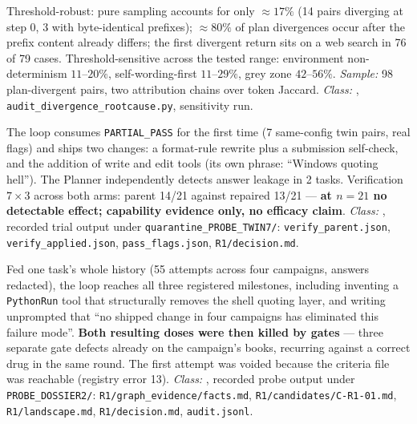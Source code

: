 \begin{description}[leftmargin=0pt,labelindent=0pt,labelsep=0pt,style=nextline,font=\normalfont,itemsep=6pt]
\item[\textbf{F25}\quad Divergence root cause, at content level.]
Threshold-robust: pure sampling accounts for only $\approx 17\%$ (14 pairs
diverging at step 0, 3 with byte-identical prefixes); $\approx 80\%$ of
plan divergences occur after the prefix content already differs; the first
divergent return sits on a web search in 76 of 79 cases.
Threshold-sensitive across the tested range: environment
non-determinism $11$--$20\%$, self-wording-first $11$--$29\%$, grey zone
$42$--$56\%$. \emph{Sample:} 98 plan-divergent pairs, two attribution
chains over token Jaccard. \emph{Class:} ,
\texttt{audit\_divergence\_rootcause.py}, sensitivity run.

\item[\textbf{F26}\quad Twin-feeding probe, end to end.]
The loop consumes \texttt{PARTIAL\_PASS} for the first time (7 same-config
twin pairs, real flags) and ships two changes: a format-rule rewrite plus a
submission self-check, and the addition of write and edit tools (its own
phrase: ``Windows quoting hell''). The Planner independently detects answer
leakage in 2 tasks. Verification $7 \times 3$ across both arms: parent
14/21 against repaired 13/21 --- \textbf{at $n=21$ no detectable effect;
capability evidence only, no efficacy claim}. \emph{Class:} ,
recorded trial output under \texttt{quarantine\_PROBE\_TWIN7/}:
\texttt{verify\_parent.json}, \texttt{verify\_applied.json},
\texttt{pass\_flags.json}, \texttt{R1/decision.md}.

\item[\textbf{F27}\quad Episodic dossier probe, isolated re-run.]
Fed one task's whole history (55 attempts across four campaigns, answers
redacted), the loop reaches all three registered milestones, including
inventing a \texttt{PythonRun} tool that structurally removes the shell
quoting layer, and writing unprompted that ``no shipped change in four
campaigns has eliminated this failure mode''. \textbf{Both resulting doses
were then killed by gates} --- three separate gate defects already on the
campaign's books, recurring against a correct drug in the same round. The
first attempt was voided because the criteria file was reachable (registry
error 13). \emph{Class:} , recorded probe output under
\texttt{PROBE\_DOSSIER2/}: \texttt{R1/graph\_evidence/facts.md},
\texttt{R1/candidates/C-R1-01.md}, \texttt{R1/landscape.md},
\texttt{R1/decision.md}, \texttt{audit.jsonl}.


\end{description}
